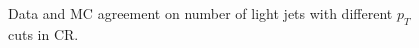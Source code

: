 \documentclass[12pt, a4paper]{book}
\begin{document}
\begin{figure}[!ht]
\begin{subfigure}[b]{0.49\textwidth}
    \end{subfigure}
    \caption{Data and MC agreement on number of light jets with different $p_T$ cuts in CR.}
\end{figure}


\end{document}
